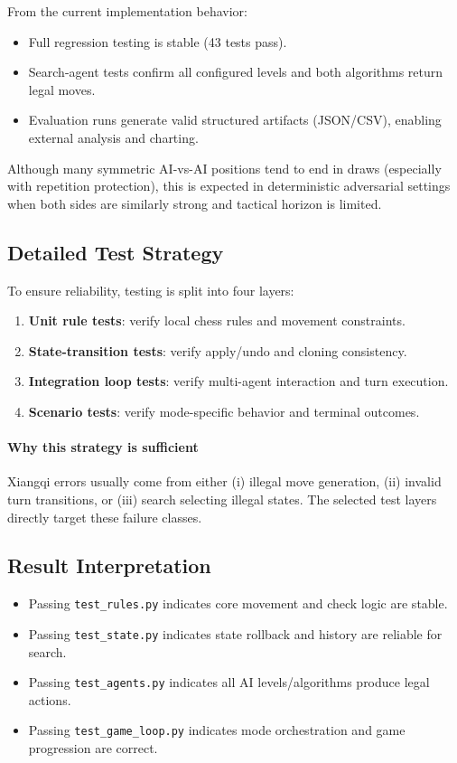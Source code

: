 \documentclass[a4paper,12pt]{article}
\begin{document}
From the current implementation behavior:
\begin{itemize}
  \item Full regression testing is stable (43 tests pass).
  \item Search-agent tests confirm all configured levels and both algorithms return legal moves.
  \item Evaluation runs generate valid structured artifacts (JSON/CSV), enabling external analysis and charting.
\end{itemize}

Although many symmetric AI-vs-AI positions tend to end in draws (especially with repetition protection), this is expected in deterministic adversarial settings when both sides are similarly strong and tactical horizon is limited.

\subsection{Detailed Test Strategy}

To ensure reliability, testing is split into four layers:
\begin{enumerate}
  \item \textbf{Unit rule tests}: verify local chess rules and movement constraints.
  \item \textbf{State-transition tests}: verify apply/undo and cloning consistency.
  \item \textbf{Integration loop tests}: verify multi-agent interaction and turn execution.
  \item \textbf{Scenario tests}: verify mode-specific behavior and terminal outcomes.
\end{enumerate}

\paragraph{Why this strategy is sufficient}
Xiangqi errors usually come from either (i) illegal move generation, (ii) invalid turn transitions, or (iii) search selecting illegal states. The selected test layers directly target these failure classes.

\subsection{Result Interpretation}

\begin{itemize}
  \item Passing \texttt{test\_rules.py} indicates core movement and check logic are stable.
  \item Passing \texttt{test\_state.py} indicates state rollback and history are reliable for search.
  \item Passing \texttt{test\_agents.py} indicates all AI levels/algorithms produce legal actions.
  \item Passing \texttt{test\_game\_loop.py} indicates mode orchestration and game progression are correct.
\end{itemize}
\end{document}
